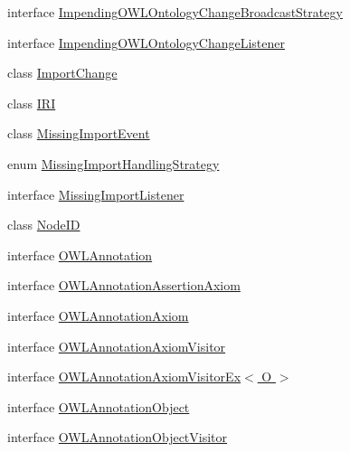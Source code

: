 \begin{DoxyCompactItemize}
\item 
interface \hyperlink{interfaceorg_1_1semanticweb_1_1owlapi_1_1model_1_1_impending_o_w_l_ontology_change_broadcast_strategy}{Impending\-O\-W\-L\-Ontology\-Change\-Broadcast\-Strategy}
\item 
interface \hyperlink{interfaceorg_1_1semanticweb_1_1owlapi_1_1model_1_1_impending_o_w_l_ontology_change_listener}{Impending\-O\-W\-L\-Ontology\-Change\-Listener}
\item 
class \hyperlink{classorg_1_1semanticweb_1_1owlapi_1_1model_1_1_import_change}{Import\-Change}
\item 
class \hyperlink{classorg_1_1semanticweb_1_1owlapi_1_1model_1_1_i_r_i}{I\-R\-I}
\item 
class \hyperlink{classorg_1_1semanticweb_1_1owlapi_1_1model_1_1_missing_import_event}{Missing\-Import\-Event}
\item 
enum \hyperlink{enumorg_1_1semanticweb_1_1owlapi_1_1model_1_1_missing_import_handling_strategy}{Missing\-Import\-Handling\-Strategy}
\item 
interface \hyperlink{interfaceorg_1_1semanticweb_1_1owlapi_1_1model_1_1_missing_import_listener}{Missing\-Import\-Listener}
\item 
class \hyperlink{classorg_1_1semanticweb_1_1owlapi_1_1model_1_1_node_i_d}{Node\-I\-D}
\item 
interface \hyperlink{interfaceorg_1_1semanticweb_1_1owlapi_1_1model_1_1_o_w_l_annotation}{O\-W\-L\-Annotation}
\item 
interface \hyperlink{interfaceorg_1_1semanticweb_1_1owlapi_1_1model_1_1_o_w_l_annotation_assertion_axiom}{O\-W\-L\-Annotation\-Assertion\-Axiom}
\item 
interface \hyperlink{interfaceorg_1_1semanticweb_1_1owlapi_1_1model_1_1_o_w_l_annotation_axiom}{O\-W\-L\-Annotation\-Axiom}
\item 
interface \hyperlink{interfaceorg_1_1semanticweb_1_1owlapi_1_1model_1_1_o_w_l_annotation_axiom_visitor}{O\-W\-L\-Annotation\-Axiom\-Visitor}
\item 
interface \hyperlink{interfaceorg_1_1semanticweb_1_1owlapi_1_1model_1_1_o_w_l_annotation_axiom_visitor_ex_3_01_o_01_4}{O\-W\-L\-Annotation\-Axiom\-Visitor\-Ex$<$ O $>$}
\item 
interface \hyperlink{interfaceorg_1_1semanticweb_1_1owlapi_1_1model_1_1_o_w_l_annotation_object}{O\-W\-L\-Annotation\-Object}
\item 
interface \hyperlink{interfaceorg_1_1semanticweb_1_1owlapi_1_1model_1_1_o_w_l_annotation_object_visitor}{O\-W\-L\-Annotation\-Object\-Visitor}

\end{DoxyCompactItemize}
